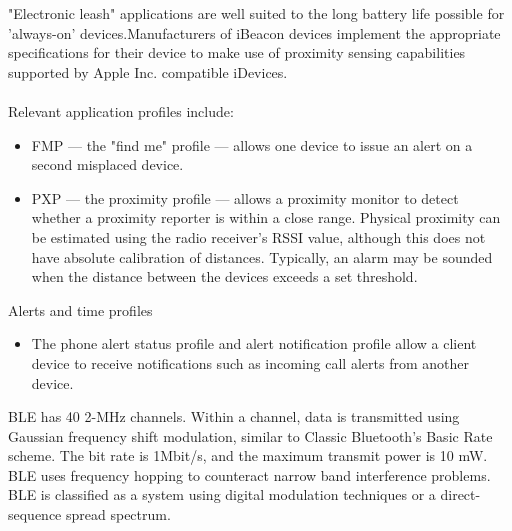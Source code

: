 \documentclass[12pt,a4paper]{report}
\begin{document}
\hspace{0.5in}"Electronic leash" applications are well suited to the long battery life possible for 'always-on' devices.Manufacturers of iBeacon devices implement the appropriate specifications for their device to make use of proximity sensing capabilities supported by Apple Inc. compatible iDevices.\\\\
Relevant application profiles include:
\begin{itemize}
	\item FMP — the "find me" profile — allows one device to issue an alert on a second misplaced device.
	\item PXP — the proximity profile — allows a proximity monitor to detect whether a proximity reporter is within a close range. Physical proximity can be estimated using the radio receiver's RSSI value, although this does not have absolute calibration of distances. Typically, an alarm may be sounded when the distance between the devices exceeds a set threshold.
\end{itemize}
Alerts and time profiles
\begin{itemize}
	\item The phone alert status profile and alert notification profile allow a client device to receive notifications such as incoming call alerts from another device.
\end{itemize}

BLE has 40 2-MHz channels. Within a channel, data is transmitted using Gaussian frequency shift modulation, similar to Classic Bluetooth's Basic Rate scheme. The bit rate is 1Mbit/s, and the maximum transmit power is 10 mW. BLE uses frequency hopping to counteract narrow band interference problems. BLE is classified as a system using digital modulation techniques or a direct-sequence spread spectrum.
\end{document}
